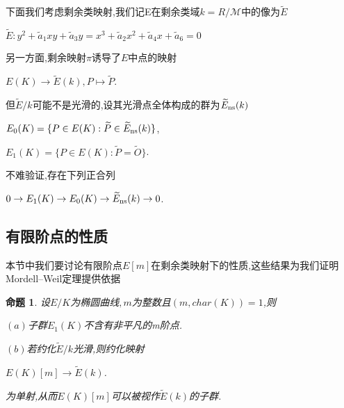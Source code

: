 \documentclass[11pt]{ctexart}
\newtheorem{pro}{命题}[section]
\begin{document}
下面我们考虑剩余类映射,我们记E在剩余类域$k=R/\mathcal{M} $中的像为$\widetilde{E}$
\begin{center}
    $\widetilde{E}:y^2+\widetilde{a}_1xy+\widetilde{a}_3y=x^3+\widetilde{a}_2x^2+\widetilde{a}_4x+\widetilde{a}_6=0$
\end{center}
另一方面,剩余映射$\pi$诱导了$E$中点的映射
\begin{center}
    $E(K)\rightarrow \widetilde{E}(k)$$,P\mapsto \widetilde{P}$.
\end{center}
但$\widetilde{E}/k$可能不是光滑的,设其光滑点全体构成的群为$\widetilde{E}_{\textup{ns}}(k)$
\begin{center}
    $E_0(K)=\{P\in E(K):\widetilde{P} \in \widetilde{E}_{\textup{ns}}(k)\}$,

    $E_1(K)=\{P\in E(K):\widetilde{P}=\widetilde{O}\}$.
\end{center}
不难验证,存在下列正合列
\begin{center}
    $0\rightarrow E_1(K)\rightarrow  E_0(K)\rightarrow  \widetilde{E}_{\textup{ns}}(k)\rightarrow 0$.
\end{center}






\subsection{有限阶点的性质}
本节中我们要讨论有限阶点$E[m]$在剩余类映射下的性质,这些结果为我们证明Mordell--Weil定理提供依据
\begin{pro}\label{4.1}设$E/K$为椭圆曲线$,m$为整数且$(m,char(K))=1$,则

    $(a)$子群$E_1(K)$不含有非平凡的m阶点.

    $(b)$若约化$\widetilde{E}/k$光滑,则约化映射
    \begin{center}
        $E(K)[m]\rightarrow \widetilde{E}(k)$.
    \end{center}
    
    为单射,从而$E(K)[m]$可以被视作$\widetilde{E}(k)$的子群.
\end{pro}
\end{document}
